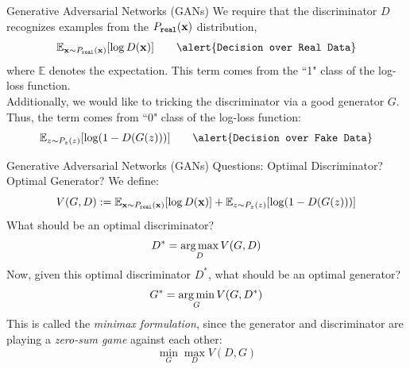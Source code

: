 \documentclass[xcolor=pdftex,dvipsnames,table,mathserif]{beamer}
\begin{document}
\begin{frame}{Generative Adversarial Networks (GANs)}
We require that the discriminator $D$ recognizes examples from the $P_{\texttt{real}}(\mathbf{x})$ distribution,
\begin{equation*}
\mathbb{E}_{\x \sim P_{\texttt{real}}(\x)}[\log D(\x)]  \quad \quad \alert{\texttt{Decision over Real Data}}
\end{equation*} where $\mathbb{E}$ denotes the expectation. This term comes from the ``1" class  of the log-loss function. \\
Additionally, we would like to tricking the discriminator via a good generator $G$. Thus, the term comes from  ``0" class of the log-loss function:
\begin{equation*}
\mathbb{E}_{z \sim P_{z}(z)}[ \log (1-D(G(z)))]  \quad \quad  \alert{\texttt{Decision over Fake Data}}
\end{equation*}
\end{frame}

\begin{frame}{Generative Adversarial Networks (GANs)}
Questions: Optimal Discriminator? Optimal Generator?
We define:
\begin{equation*}
V(G,D):= \mathbb{E}_{\mathbf{x} \sim P_{\texttt{real}}(\mathbf{x})}[\log D(\mathbf{x})] + \mathbb{E}_{z \sim P_{z}(z)}[ \log (1-D(G(z)))]
\end{equation*}
What should be an optimal discriminator? \pause
\begin{equation*}
D^* = \operatorname*{arg\,max}_{D} V(G,D)
\end{equation*}
Now, given this optimal discriminator $D^*$, what should be an optimal generator? \pause
\begin{equation*}
G^* = \operatorname*{arg\,min}_{G} V(G,D^*)
\end{equation*}
This is called the \emph{minimax formulation}, since the generator and discriminator are playing a \emph{zero-sum game} against each other:
\begin{equation}
\min_{G} \max _{D} V(D,G)
\end{equation}
\end{frame}
\end{document}
